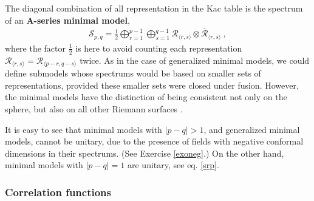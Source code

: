 \documentclass[12pt, a4paper, notitlepage, twoside]{report}
\numberwithin{equation}{section}
\theoremstyle{break}
\begin{document}
The diagonal combination of all representation in the Kac table is the spectrum of an \textbf{A-series minimal model},
\begin{align}
 \boxed{ \mathcal{S}_{p,q} = \frac12 \bigoplus_{r=1}^{p-1} \bigoplus_{s=1}^{q-1} \mathcal{R}_{\langle r,s \rangle}\otimes \bar{\mathcal{R}}_{\langle r,s \rangle} } \ ,
\label{smin}
\end{align}
where the factor $\frac12$ is here to avoid counting each representation $\mathcal{R}_{\langle r,s \rangle}=\mathcal{R}_{\langle p-r,q-s \rangle}$ twice.
As in the case of generalized minimal models, we could define submodels whose spectrums would be based on smaller sets of representations, provided these smaller sets were closed under fusion.
However, the minimal models have the distinction of being consistent not only on the sphere, but also on all other Riemann surfaces \cite{fms97}.

It is easy to see that minimal models with $|p-q|>1$, and generalized minimal models, cannot be unitary, due to the presence of fields with negative conformal dimensions in their spectrums. (See Exercise \ref{exoneg}.)
On the other hand, minimal models with $|p-q|=1$ are unitary, see eq. \eqref{srp}.

\subsubsection{Correlation functions}
\end{document}
